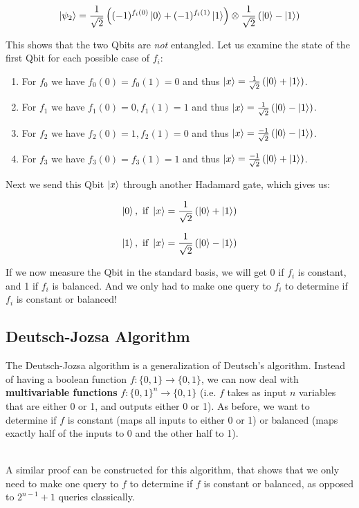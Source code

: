 \documentclass[12pt]{article}
\begin{document}
\[ \ket{\psi_2} = \frac{1}{\sqrt{2}}\left( (-1)^{f_i(0)}\ket{0} + (-1)^{f_i(1)}\ket{1} \right) \otimes \frac{1}{\sqrt{2}}\left( \ket{0} - \ket{1} \right) \]

\noindent
This shows that the two Qbits are \textit{not} entangled.
Let us examine the state of the first Qbit for each possible case of $f_i$:

\begin{enumerate}
    \item For $f_0$ we have $f_0(0) = f_0(1) = 0$ and thus $\ket{x} = \frac{1}{\sqrt{2}}\left( \ket{0} + \ket{1} \right)$.
    \item For $f_1$ we have $f_1(0) = 0, f_1(1) = 1$ and thus $\ket{x} = \frac{1}{\sqrt{2}}\left( \ket{0} - \ket{1} \right)$.
    \item For $f_2$ we have $f_2(0) = 1, f_2(1) = 0$ and thus $\ket{x} = \frac{-1}{\sqrt{2}}\left( \ket{0} - \ket{1} \right)$.
    \item For $f_3$ we have $f_3(0) = f_3(1) = 1$ and thus $\ket{x} = \frac{-1}{\sqrt{2}}\left( \ket{0} + \ket{1} \right)$.
\end{enumerate}

\noindent
Next we send this Qbit $\ket{x}$ through another Hadamard gate, which gives us:

\[ \ket{0}, \ \text{if } \ket{x} = \frac{1}{\sqrt{2}}\left( \ket{0} + \ket{1} \right) \]

\[ \ket{1}, \ \text{if } \ket{x} = \frac{1}{\sqrt{2}}\left( \ket{0} - \ket{1} \right) \]

\noindent
If we now measure the Qbit in the standard basis, we will get 0 if $f_i$ is constant, and 1 if $f_i$ is balanced.
And we only had to make one query to $f_i$ to determine if $f_i$ is constant or balanced!

\subsection*{Deutsch-Jozsa Algorithm}
The Deutsch-Jozsa algorithm is a generalization of Deutsch's algorithm.
Instead of having a boolean function $f:\{ 0, 1 \} \rightarrow \{ 0, 1 \}$, we can now deal with \textbf{multivariable functions} $f:\{ 0, 1 \}^n \rightarrow \{ 0, 1 \}$ (i.e. $f$ takes as input $n$ variables that are either 0 or 1, and outputs either 0 or 1).
As before, we want to determine if $f$ is constant (maps all inputs to either 0 or 1) or balanced (maps exactly half of the inputs to 0 and the other half to 1).

\noindent
\\
A similar proof can be constructed for this algorithm, that shows that we only need to make one query to $f$ to determine if $f$ is constant or balanced, as opposed to $2^{n-1} + 1$ queries classically.
\end{document}
